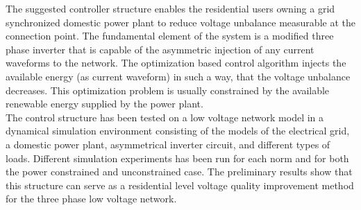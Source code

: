 \begin{enumerate}
    The suggested controller structure enables the residential users owning a grid synchronized domestic power plant to reduce voltage unbalance measurable at the connection point. The fundamental element of the system is a modified three phase inverter that is capable of the asymmetric injection of any current waveforms to the network. The optimization based control algorithm injects the available energy (as current waveform) in such a way, that the voltage unbalance decreases. This optimization problem is usually constrained by the available renewable energy supplied by the power plant.\\
    The control structure has been tested on a low voltage network model in a dynamical simulation environment consisting of the models of the electrical grid, a domestic power plant, asymmetrical inverter circuit, and different types of loads. Different simulation experiments has been run for each norm and for both the power constrained and unconstrained case. The preliminary results show that this structure can serve as a residential level voltage quality improvement method for the three phase low voltage network.
\end{enumerate}
